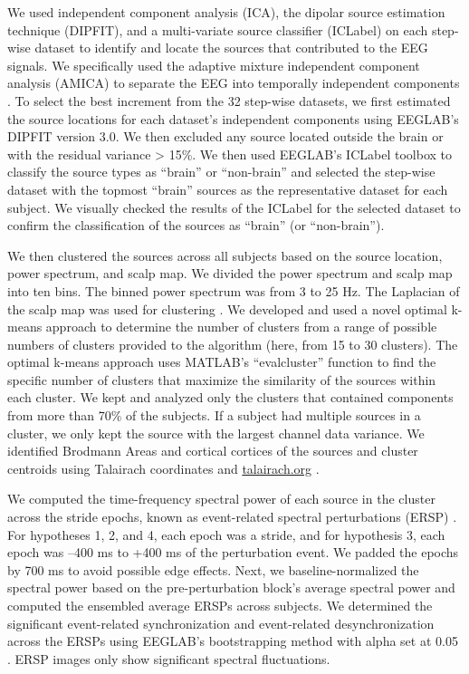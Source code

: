 \documentclass[../thesis_seyed.tex]{subfiles}
\begin{document}
We used independent component analysis (ICA), the dipolar source estimation technique (DIPFIT), and a multi-variate source classifier (ICLabel) on each step-wise dataset to identify and locate the sources that contributed to the EEG signals. We specifically used the adaptive mixture independent component analysis (AMICA) to separate the EEG into temporally independent components \cite{Palmer2008-jx}. To select the best increment from the 32 step-wise datasets, we first estimated the source locations for each dataset's independent components using EEGLAB’s DIPFIT version 3.0. We then excluded any source located outside the brain or with the residual variance > 15\%. We then used EEGLAB’s ICLabel toolbox to classify the source types as “brain” or “non-brain” \cite{Pion-Tonachini2017-ez} and selected the step-wise dataset with the topmost “brain” sources as the representative dataset for each subject. We visually checked the results of the ICLabel for the selected dataset to confirm the classification of the sources as “brain” (or “non-brain”).

We then clustered the sources across all subjects based on the source location, power spectrum, and scalp map. We divided the power spectrum and scalp map into ten bins. The binned power spectrum was from 3 to 25 Hz. The Laplacian of the scalp map was used for clustering \cite{Hjorth1975-ea}. We developed and used a novel optimal k-means approach to determine the number of clusters from a range of possible numbers of clusters provided to the algorithm (here, from 15 to 30 clusters). The optimal k-means approach uses MATLAB’s “evalcluster” function to find the specific number of clusters that maximize the similarity of the sources within each cluster. We kept and analyzed only the clusters that contained components from more than 70\% of the subjects. If a subject had multiple sources in a cluster, we only kept the source with the largest channel data variance. We identified Brodmann Areas and cortical cortices of the sources and cluster centroids using Talairach coordinates and \href{http://talairach.org/}{talairach.org} \cite{Lancaster2000-aj,Shirazi2019-im}.

We computed the time-frequency spectral power of each source in the cluster across the stride epochs, known as event-related spectral perturbations (ERSP) \cite{Makeig1993-jx}. For hypotheses 1, 2, and 4, each epoch was a stride, and for hypothesis 3, each epoch was –400 ms to +400 ms of the perturbation event. We padded the epochs by 700 ms to avoid possible edge effects. Next, we baseline-normalized the spectral power based on the pre-perturbation block's average spectral power and computed the ensembled average ERSPs across subjects. We determined the significant event-related synchronization and event-related desynchronization across the ERSPs using EEGLAB’s bootstrapping method with alpha set at 0.05 \cite{Pfurtscheller1999-oi}. ERSP images only show significant spectral fluctuations.
\end{document}
